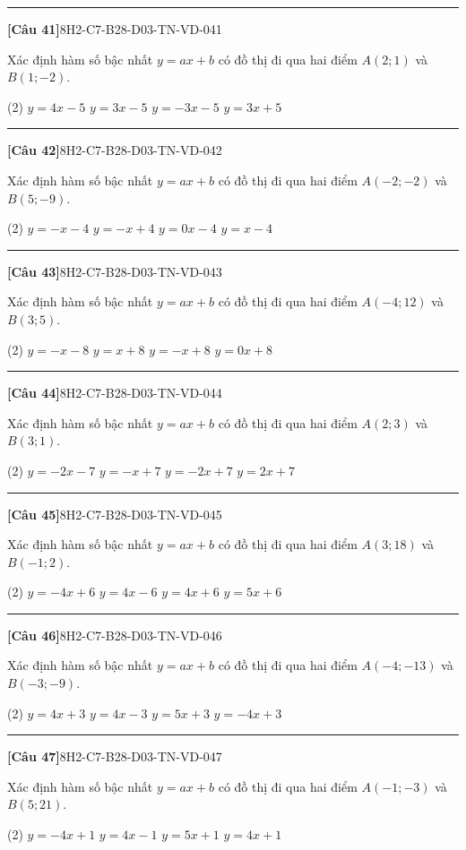 \documentclass[12pt,a4paper]{article}
\newif\ifloigiai
\newenvironment{cauhoi}[2]{%
  \par\medskip\noindent\rule{\textwidth}{0.4pt}\par\nopagebreak
  \noindent\textbf{[#1]}\hfill{\scriptsize\ttfamily #2}\par\nopagebreak\smallskip}{\par}
\newcommand{\dapan}[1]{\ifloigiai\par\smallskip\noindent\textit{Đáp án:} \textbf{#1}\par\fi}
\begin{document}
\begin{cauhoi}{Câu 41}{8H2-C7-B28-D03-TN-VD-041}
Xác định hàm số bậc nhất $y=ax+b$ có đồ thị đi qua hai điểm $A(2;1)$ và $B(1;-2)$.
\begin{tasks}(2)
\task $y=4x-5$
\task $y=3x-5$
\task $y=-3x-5$
\task $y=3x+5$
\end{tasks}
\dapan{B}
\end{cauhoi}
\begin{cauhoi}{Câu 42}{8H2-C7-B28-D03-TN-VD-042}
Xác định hàm số bậc nhất $y=ax+b$ có đồ thị đi qua hai điểm $A(-2;-2)$ và $B(5;-9)$.
\begin{tasks}(2)
\task $y=-x-4$
\task $y=-x+4$
\task $y=0x-4$
\task $y=x-4$
\end{tasks}
\dapan{A}
\end{cauhoi}
\begin{cauhoi}{Câu 43}{8H2-C7-B28-D03-TN-VD-043}
Xác định hàm số bậc nhất $y=ax+b$ có đồ thị đi qua hai điểm $A(-4;12)$ và $B(3;5)$.
\begin{tasks}(2)
\task $y=-x-8$
\task $y=x+8$
\task $y=-x+8$
\task $y=0x+8$
\end{tasks}
\dapan{C}
\end{cauhoi}
\begin{cauhoi}{Câu 44}{8H2-C7-B28-D03-TN-VD-044}
Xác định hàm số bậc nhất $y=ax+b$ có đồ thị đi qua hai điểm $A(2;3)$ và $B(3;1)$.
\begin{tasks}(2)
\task $y=-2x-7$
\task $y=-x+7$
\task $y=-2x+7$
\task $y=2x+7$
\end{tasks}
\dapan{C}
\end{cauhoi}
\begin{cauhoi}{Câu 45}{8H2-C7-B28-D03-TN-VD-045}
Xác định hàm số bậc nhất $y=ax+b$ có đồ thị đi qua hai điểm $A(3;18)$ và $B(-1;2)$.
\begin{tasks}(2)
\task $y=-4x+6$
\task $y=4x-6$
\task $y=4x+6$
\task $y=5x+6$
\end{tasks}
\dapan{C}
\end{cauhoi}
\begin{cauhoi}{Câu 46}{8H2-C7-B28-D03-TN-VD-046}
Xác định hàm số bậc nhất $y=ax+b$ có đồ thị đi qua hai điểm $A(-4;-13)$ và $B(-3;-9)$.
\begin{tasks}(2)
\task $y=4x+3$
\task $y=4x-3$
\task $y=5x+3$
\task $y=-4x+3$
\end{tasks}
\dapan{A}
\end{cauhoi}
\begin{cauhoi}{Câu 47}{8H2-C7-B28-D03-TN-VD-047}
Xác định hàm số bậc nhất $y=ax+b$ có đồ thị đi qua hai điểm $A(-1;-3)$ và $B(5;21)$.
\begin{tasks}(2)
\task $y=-4x+1$
\task $y=4x-1$
\task $y=5x+1$
\task $y=4x+1$
\end{tasks}
\dapan{D}
\end{cauhoi}
\end{document}
